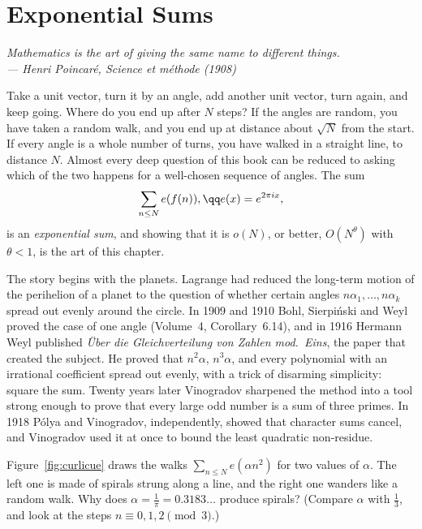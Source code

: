 \chapter{Exponential Sums}

\begin{center}\itshape
Mathematics is the art of giving the same name to different things.\\
\upshape --- Henri Poincaré, \emph{Science et méthode} (1908)
\end{center}

Take a unit vector, turn it by an angle, add another unit vector, turn again, and keep going. Where do you end up after $N$ steps? If the angles are random, you have taken a random walk,
and you end up at distance about $\sqrt N$ from the start. If every angle is a whole number of turns, you have walked in a straight line, to distance $N$. Almost every deep question
of this book can be reduced to asking which of the two happens for a well-chosen sequence of angles. The sum
\[
\sum_{n\le N}e(f(n)),\qq e(x)=e^{2\pi ix},
\]
is an \emph{exponential sum}, and showing that it is $o(N)$, or better, $O(N^\theta)$ with $\theta<1$, is the art of this chapter.

The story begins with the planets. Lagrange had reduced the long-term motion of the perihelion of a planet to the question of whether certain angles $n\alpha_1,\dots,n\alpha_k$ spread out evenly
around the circle. In 1909 and 1910 Bohl, Sierpiński and Weyl proved the case of one angle (Volume~4, Corollary~6.14), and in 1916 Hermann Weyl published \emph{Über die Gleichverteilung von Zahlen mod.\ Eins},
the paper that created the subject. He proved that $n^2\alpha$, $n^3\alpha$, and every polynomial with an irrational coefficient spread out evenly, with a trick of disarming simplicity: square the sum. Twenty years later
Vinogradov sharpened the method into a tool strong enough to prove that every large odd number is a sum of three primes. In 1918 Pólya and Vinogradov, independently, showed that character sums cancel, and Vinogradov
used it at once to bound the least quadratic non-residue.

\begin{think}
Figure~\ref{fig:curlicue} draws the walks $\sum_{n\le N}e(\alpha n^2)$ for two values of $\alpha$. The left one is made of spirals strung along a line, and the right one wanders like a random walk. Why does
$\alpha=\frac1\pi=0.3183\ldots$ produce spirals? (Compare $\alpha$ with $\frac13$, and look at the steps $n\equiv0,1,2\pmod3$.)
\end{think}

